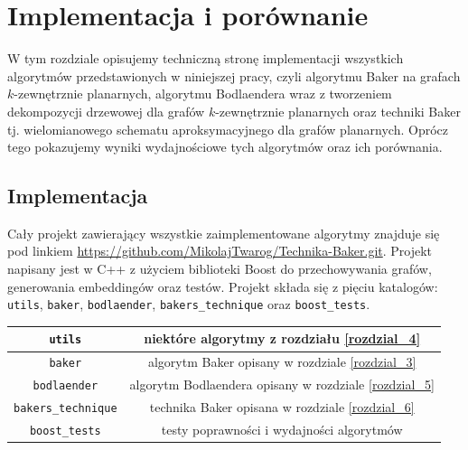 \documentclass[twoside,a4paper,12pt]{report} %
\theoremstyle{break}
\begin{document}
\chapter{Implementacja i porównanie}
W tym rozdziale opisujemy techniczną stronę implementacji wszystkich algorytmów przedstawionych w niniejszej pracy, czyli algorytmu Baker na grafach $k$-zewnętrznie planarnych, algorytmu Bodlaendera wraz z tworzeniem dekompozycji drzewowej dla grafów $k$-zewnętrznie planarnych oraz techniki Baker tj. wielomianowego schematu aproksymacyjnego dla grafów planarnych. Oprócz tego pokazujemy wyniki wydajnościowe tych algorytmów oraz ich porównania.

\section{Implementacja}
Cały projekt zawierający wszystkie zaimplementowane algorytmy znajduje się pod linkiem \href{https://github.com/MikolajTwarog/Technika-Baker.git}{https://github.com/MikolajTwarog/Technika-Baker.git}. Projekt napisany jest w C++ z użyciem biblioteki Boost do przechowywania grafów, generowania embeddingów oraz testów. Projekt składa się z pięciu katalogów: \texttt{utils}, \texttt{baker}, \texttt{bodlaender}, \texttt{bakers\_technique} oraz \texttt{boost\_tests}.

\begin{center}
 \begin{tabular}{|c||c|} 
 \hline
 \texttt{utils} & niektóre algorytmy z rozdziału \ref{rozdzial_4} \\
 \hline
 \texttt{baker} & algorytm Baker opisany w rozdziale \ref{rozdzial_3}\\
 \hline
 \texttt{bodlaender} & algorytm Bodlaendera opisany w rozdziale \ref{rozdzial_5} \\
 \hline
 \texttt{bakers\_technique} & technika Baker opisana w rozdziale \ref{rozdzial_6}\\
 \hline
 \texttt{boost\_tests} & testy poprawności i wydajności algorytmów\\
 \hline
\end{tabular}
\end{center}
\end{document}
